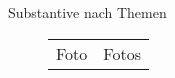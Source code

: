 \begin{semantics}{Substantive nach Themen}{}
\begin{figure}[H]
\begin{tabular}{ll}
	Foto		& Fotos		\\
\end{tabular}
\end{figure}
\end{semantics}
